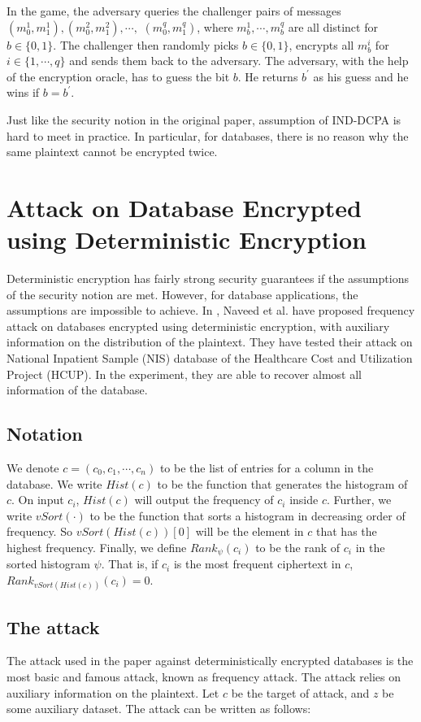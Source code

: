 \documentclass[10pt]{book}
\begin{document}
In the game, the adversary queries the challenger pairs of messages $(m_0^{1}, m_1^{1}), (m_0^{2}, m_1^{2}), \cdots,$ $(m_0^{q}, m_1^{q})$, where $m_b^{1}, \cdots, m_b^{q}$ are all distinct for $b \in \{0, 1\}$. The challenger then randomly picks $b \in \{0, 1\}$, encrypts all $m_b^{i}$ for $i \in \{1, \cdots, q\}$ and sends them back to the adversary. The adversary, with the help of the encryption oracle, has to guess the bit $b$. He returns $b^{'}$ as his guess and he wins if $b = b^{'}$.

Just like the security notion in the original paper, assumption of IND-DCPA is hard to meet in practice. In particular, for databases, there is no reason why the same plaintext cannot be encrypted twice.




\section{Attack on Database Encrypted using Deterministic Encryption}
Deterministic encryption has fairly strong security guarantees if the assumptions of the security notion are met. However, for database applications, the assumptions are impossible to achieve. In \cite{Naveed:2015:IAP:2810103.2813651}, Naveed et al. have proposed frequency attack on databases encrypted using deterministic encryption, with auxiliary information on the distribution of the plaintext. They have tested their attack on National Inpatient Sample (NIS) database of the Healthcare Cost and Utilization Project (HCUP). In the experiment, they are able to recover almost all information of the database.

\subsection{Notation}
We denote $c = (c_0, c_1, \cdots, c_n)$ to be the list of entries for a column in the database. We write $Hist(c)$ to be the function that generates the histogram of $c$. On input $c_i$, $Hist(c)$ will output the frequency of $c_i$ inside $c$. Further, we write $vSort(\cdot)$ to be the function that sorts a histogram in decreasing order of frequency. So $vSort(Hist(c))[0]$ will be the element in $c$ that has the highest frequency. Finally, we define $Rank_{\psi}(c_i)$ to be the rank of $c_i$ in the sorted histogram $\psi$. That is, if $c_i$ is the most frequent ciphertext in $c$, $Rank_{vSort(Hist(c))}(c_i) = 0$.


\subsection{The attack}
The attack used in the paper against deterministically encrypted databases is the most basic and famous attack, known as frequency attack. The attack relies on auxiliary information on the plaintext. Let $c$ be the target of attack, and $z$ be some auxiliary dataset. The attack can be written as follows:
\end{document}

